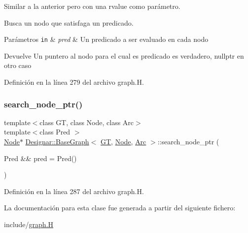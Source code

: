 Similar a la anterior pero con una rvalue como parámetro. 

Busca un nodo que satisfaga un predicado.


\begin{DoxyParams}[1]{Parámetros}
\mbox{\tt in}  & {\em pred} & Un predicado a ser evaluado en cada nodo \\
\hline
\end{DoxyParams}
\begin{DoxyReturn}{Devuelve}
Un puntero al nodo para el cual es predicado es verdadero, {\ttfamily nullptr} en otro caso 
\end{DoxyReturn}


Definición en la línea 279 del archivo graph.\+H.

\mbox{\label{class_designar_1_1_base_graph_a1f19e5a79bfa156fd4cd80f3d8e27aa4}} 
\subsubsection{\texorpdfstring{search\+\_\+node\+\_\+ptr()}{search\_node\_ptr()}\hspace{0.1cm}{\footnotesize\ttfamily [2/2]}}
{\footnotesize\ttfamily template$<$class GT, class Node, class Arc$>$ \\
template$<$class Pred $>$ \\
\hyperlink{namespace_designar_a5af326c65aa2bd26b26c410f2030d09e}{Node}$\ast$ \hyperlink{class_designar_1_1_base_graph}{Designar\+::\+Base\+Graph}$<$ \hyperlink{demo-buildgraph_8_c_a3001c40d2c31ca87ed96cd7d1334a55e}{GT}, \hyperlink{namespace_designar_a5af326c65aa2bd26b26c410f2030d09e}{Node}, \hyperlink{namespace_designar_a3f55fb5513d62ff47cbc8f72b8e95d6f}{Arc} $>$\+::search\+\_\+node\+\_\+ptr (\begin{DoxyParamCaption}\item[{Pred \&\&}]{pred = {\ttfamily Pred()} }\end{DoxyParamCaption})\hspace{0.3cm}{\ttfamily [inline]}}



Definición en la línea 287 del archivo graph.\+H.



La documentación para esta clase fue generada a partir del siguiente fichero\+:\begin{DoxyCompactItemize}
\item 
include/\hyperlink{graph_8_h}{graph.\+H}\end{DoxyCompactItemize}
